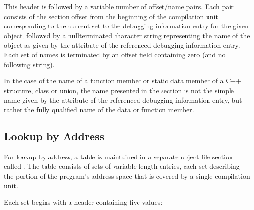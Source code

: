 This header is followed by a variable number of offset/name
pairs. Each pair consists of the section offset from the
beginning of the compilation unit corresponding to the current
set to the debugging information entry for the given object,
followed by a null\dash terminated character string representing
the name of the object as given by the  attribute
of the referenced debugging information entry. Each set of
names is terminated by an offset field containing zero (and
no following string).


In the case of the name of a function member or static data
member of a C++ structure, class or union, the name presented
in the 
section is not the simple name given
by the  attribute of the referenced debugging
information entry, but rather the fully qualified name of
the data or function member.

\subsection{Lookup by Address}

For 
lookup by address, a table is maintained in a separate
object file section called 
. The table consists
of sets of variable length entries, each set describing the
portion of the program’s address space that is covered by
a single compilation unit.

Each set begins with a header containing five values:

